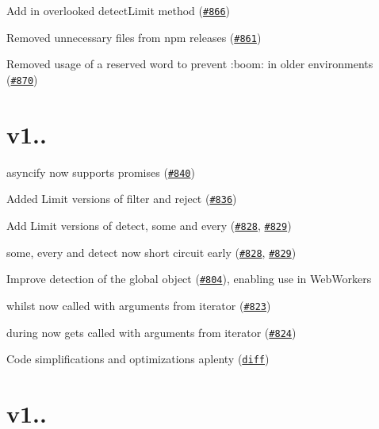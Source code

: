 \begin{DoxyItemize}
\item Add in overlooked {\ttfamily detect\+Limit} method (\href{https://github.com/caolan/async/issues/866}{\tt \#866})
\item Removed unnecessary files from npm releases (\href{https://github.com/caolan/async/issues/861}{\tt \#861})
\item Removed usage of a reserved word to prevent \+:boom\+: in older environments (\href{https://github.com/caolan/async/issues/870}{\tt \#870})
\end{DoxyItemize}

\section*{v1..}


\begin{DoxyItemize}
\item {\ttfamily asyncify} now supports promises (\href{https://github.com/caolan/async/issues/840}{\tt \#840})
\item Added {\ttfamily Limit} versions of {\ttfamily filter} and {\ttfamily reject} (\href{https://github.com/caolan/async/issues/836}{\tt \#836})
\item Add {\ttfamily Limit} versions of {\ttfamily detect}, {\ttfamily some} and {\ttfamily every} (\href{https://github.com/caolan/async/issues/828}{\tt \#828}, \href{https://github.com/caolan/async/issues/829}{\tt \#829})
\item {\ttfamily some}, {\ttfamily every} and {\ttfamily detect} now short circuit early (\href{https://github.com/caolan/async/issues/828}{\tt \#828}, \href{https://github.com/caolan/async/issues/829}{\tt \#829})
\item Improve detection of the global object (\href{https://github.com/caolan/async/issues/804}{\tt \#804}), enabling use in Web\+Workers
\item {\ttfamily whilst} now called with arguments from iterator (\href{https://github.com/caolan/async/issues/823}{\tt \#823})
\item {\ttfamily during} now gets called with arguments from iterator (\href{https://github.com/caolan/async/issues/824}{\tt \#824})
\item Code simplifications and optimizations aplenty (\href{https://github.com/caolan/async/compare/v1.3.0...v1.4.0}{\tt diff})
\end{DoxyItemize}

\section*{v1..}

